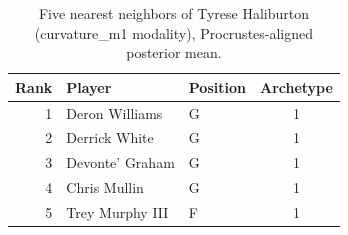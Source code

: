\begin{table}[htbp]
  \centering\small
  \begin{tabular}{rllc}
    \toprule
    Rank & Player & Position & Archetype \\
    \midrule
    1 & Deron Williams & G & 1 \\
    2 & Derrick White & G & 1 \\
    3 & Devonte' Graham & G & 1 \\
    4 & Chris Mullin & G & 1 \\
    5 & Trey Murphy III & F & 1 \\
    \bottomrule
  \end{tabular}
  \caption{Five nearest neighbors of Tyrese Haliburton (curvature_m1 modality), Procrustes-aligned posterior mean.}
  \label{tab:Tyrese_Haliburton_neighbors_curvature_m1}
\end{table}

